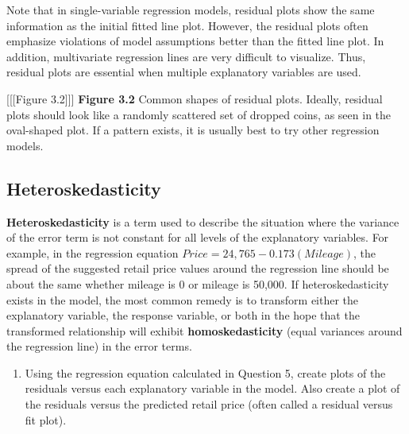 \documentclass[
]{report}
\providecommand{\tightlist}{%
  \setlength{\itemsep}{0pt}\setlength{\parskip}{0pt}}
\theoremstyle{definition}
\theoremstyle{definition}
\theoremstyle{definition}
\theoremstyle{definition}
\theoremstyle{remark}
\begin{document}
Note that in single-variable regression models, residual plots show the same information as the initial fitted line plot. However, the residual plots often emphasize violations of model assumptions better than the fitted line plot. In addition, multivariate regression lines are very difficult to visualize. Thus, residual plots are essential
when multiple explanatory variables are used.

{[}{[}{[}Figure 3.2{]}{]}{]}
\textbf{Figure 3.2} Common shapes of residual plots. Ideally, residual plots should look like a randomly scattered set of dropped
coins, as seen in the oval-shaped plot. If a pattern exists, it is usually best to try other regression models.

\hypertarget{heteroskedasticity}{%
\subsection*{Heteroskedasticity}\label{heteroskedasticity}}

\textbf{Heteroskedasticity} is a term used to describe the situation where the variance of the error term is not constant for all levels of the explanatory variables. For example, in the regression equation \(Price = 24,765 - 0.173 (Mileage)\), the spread of the suggested retail price values around the regression line should be about the same whether mileage is 0 or mileage is 50,000. If heteroskedasticity exists in the model, the most common remedy is to transform either the explanatory variable, the response variable, or both in the hope that the transformed relationship will exhibit \textbf{homoskedasticity} (equal variances around the regression line) in the error terms.

\begin{enumerate}
\def\labelenumi{\arabic{enumi}.}
\setcounter{enumi}{6}
\tightlist
\item
  Using the regression equation calculated in Question 5, create plots of the residuals versus each explanatory variable in the model. Also create a plot of the residuals versus the predicted retail price (often called a residual versus fit plot).
\end{enumerate}
\end{document}
